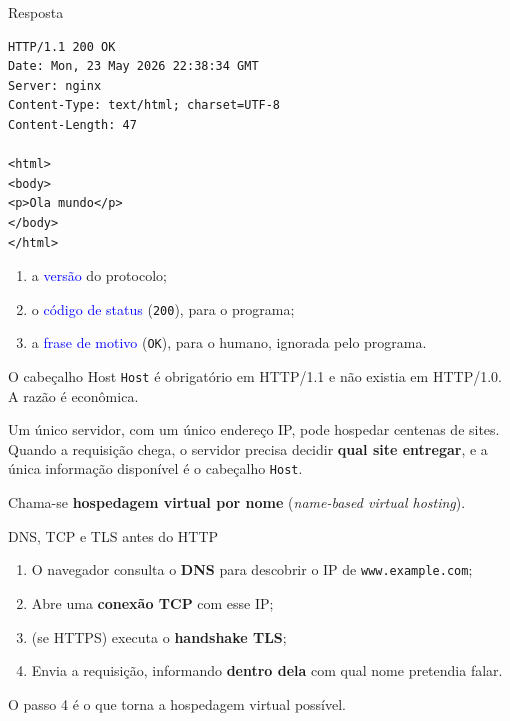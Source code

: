 \documentclass{beamer}
\newcommand{\tcb}[1]{\textcolor{blue}{#1}}
\begin{document}
\begin{frame}[fragile]{Resposta}
  \begin{verbatim}
HTTP/1.1 200 OK
Date: Mon, 23 May 2026 22:38:34 GMT
Server: nginx
Content-Type: text/html; charset=UTF-8
Content-Length: 47

<html>
<body>
<p>Ola mundo</p>
</body>
</html>
  \end{verbatim}

  \begin{enumerate}
    \item a \tcb{versão} do protocolo;
    \item o \tcb{código de status} (\texttt{200}), para o programa;
    \item a \tcb{frase de motivo} (\texttt{OK}), para o humano, ignorada pelo programa.
  \end{enumerate}
\end{frame}

\begin{frame}{O cabeçalho Host}
  \texttt{Host} é obrigatório em HTTP/1.1 e não existia em HTTP/1.0.
  A razão é econômica.

  \vspace{0.4cm}
  Um único servidor, com um único endereço IP, pode hospedar centenas de sites. Quando
  a requisição chega, o servidor precisa decidir \textbf{qual site entregar}, e a
  única informação disponível é o cabeçalho \texttt{Host}.

  \vspace{0.4cm}
  Chama-se \textbf{hospedagem virtual por nome}
  (\textit{name-based virtual hosting}).
\end{frame}

\begin{frame}{DNS, TCP e TLS antes do HTTP}
  \begin{enumerate}
    \item O navegador consulta o \textbf{DNS} para descobrir o IP de
          \texttt{www.example.com};
    \item Abre uma \textbf{conexão TCP} com esse IP;
    \item (se HTTPS) executa o \textbf{handshake TLS};
    \item Envia a requisição, informando \textbf{dentro dela} com qual nome
          pretendia falar.
  \end{enumerate}

  \vspace{0.5cm}
  O passo 4 é o que torna a hospedagem virtual possível.
\end{frame}
\end{document}
